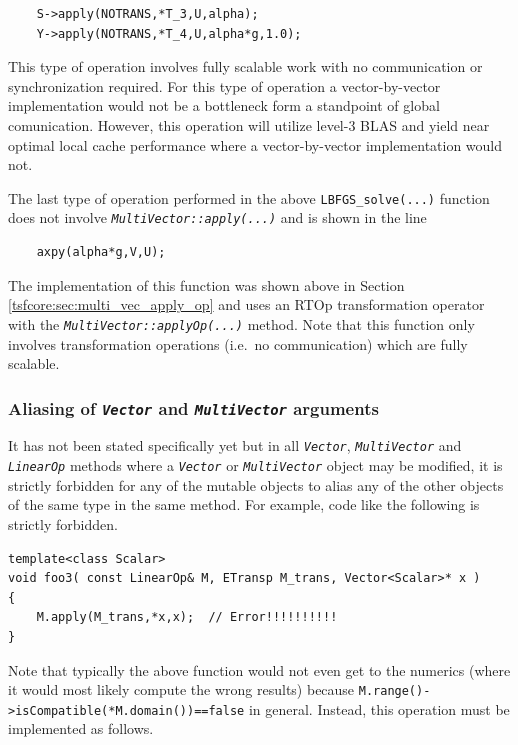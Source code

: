 \documentclass[10pt,fleqn]{article}
\begin{document}
{\scriptsize\begin{verbatim}
    S->apply(NOTRANS,*T_3,U,alpha);
    Y->apply(NOTRANS,*T_4,U,alpha*g,1.0);
\end{verbatim}}

This type of operation involves fully scalable work with no
communication or synchronization required.  For this type of operation
a vector-by-vector implementation would not be a bottleneck form a
standpoint of global comunication.  However, this operation will
utilize level-3 BLAS and yield near optimal local cache performance
where a vector-by-vector implementation would not.

The last type of operation performed in the above
\texttt{LBFGS\_solve(...)}  function does not involve
\texttt{\textit{MultiVector\-::apply(...)}} and is shown in the line

{\scriptsize\begin{verbatim}
    axpy(alpha*g,V,U);
\end{verbatim}}

The implementation of this function was shown above in Section
\ref{tsfcore:sec:multi_vec_apply_op} and uses an RTOp transformation
operator with the \texttt{\textit{MultiVector\-::applyOp(...)}}
method.  Note that this function only involves transformation
operations (i.e.~no communication) which are fully scalable.

%
\subsubsection{Aliasing of \texttt{\textit{Vector}} and \texttt{\textit{MultiVector}} arguments}
\label{tsfcore:sec:aliasing}
%

It has not been stated specifically yet but in all
\texttt{\textit{Vector}}, \texttt{\textit{MultiVector}} and
\texttt{\textit{LinearOp}} methods where a \texttt{\textit{Vector}} or
\texttt{\textit{MultiVector}} object may be modified, it is strictly
forbidden for any of the mutable objects to alias any of the other
objects of the same type in the same method.  For example, code like the
following is strictly forbidden.

{\scriptsize\begin{verbatim}
template<class Scalar>
void foo3( const LinearOp& M, ETransp M_trans, Vector<Scalar>* x )
{
    M.apply(M_trans,*x,x);  // Error!!!!!!!!!!
}
\end{verbatim}}

Note that typically the above function would not even get to the numerics
(where it would most likely compute the wrong results) because
\texttt{M.range()->isCompatible(*M.domain())==false} in general.
Instead, this operation must be implemented as follows.
\end{document}
